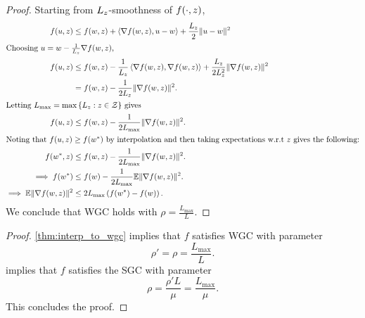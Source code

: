 \interpToWGC*
\begin{proof}
    Starting from \( L_{z} \)-smoothness of \( f(\cdot, z) \),
    \begin{align*}
        f(u, z) &\leq f(w, z) + \left\langle\nabla f(w, z), u - w\right\rangle + \frac{L_z}{2}\|u - w\|^2\\
        \intertext{Choosing \( u = w- \frac{1}{L_z}\nabla f(w, z) \),}
        f(u, z) &\leq f(w, z) - \frac{1}{L_{z}}\left\langle\nabla f(w, z), \nabla f(w,z)\right\rangle + \frac{L_z}{2L^2_z}\|\nabla f(w,z)\|^2\\
        &= f(w, z) - \frac{1}{2L_{z}}\|\nabla f(w,z)\|^2.\\
        \intertext{Letting \( L_{\text{max}} = \max \left\{L_z: z\in \mathcal{Z}\right\} \) gives }
        f(u, z) &\leq f(w, z) - \frac{1}{2L_{{\text{max}}}}\|\nabla f(w,z)\|^2.\\
        \intertext{Noting that \( f(u,z) \geq f(w^*) \) by interpolation and then taking expectations w.r.t \( z\) gives the following:}
        f(w^*, z) &\leq f(w, z) - \frac{1}{2L_{{\text{max}}}}\|\nabla f(w,z)\|^2.\\
        \implies f(w^*) &\leq f(w) - \frac{1}{2L_{{\text{max}}}}\mathbb{E} \|\nabla f(w,z)\|^2.\\
        \implies \mathbb{E} \|\nabla f(w,z)\|^2 &\leq 2 L_{\text{max}} \left(f(w^*) - f(w)\right).
    \end{align*}
    We conclude that WGC holds with \( \rho = \frac{L_{\text{max}}}{L} \).
\end{proof}

\interpToSGC*
\begin{proof}
    \autoref{thm:interp_to_wgc} implies that \( f \) satisfies WGC with parameter
    \[ \rho' = \rho = \frac{L_{\text{max}}}{L}. \]
    \citet[Proposition 1]{vaswani2019fast} implies that \( f \) satisfies the SGC with parameter
    \[ \rho = \frac{\rho' L}{\mu} = \frac{L_{\text{max}}}{\mu}.  \]
    This concludes the proof.
\end{proof}
